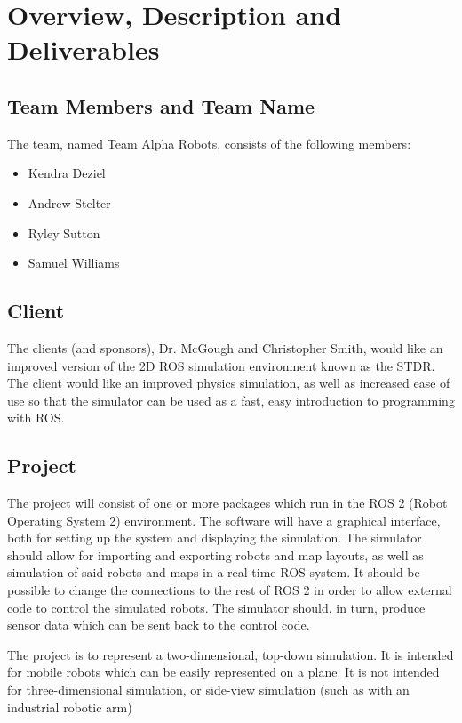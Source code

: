 

\chapter{Overview, Description and Deliverables}

\section{Team Members and Team Name}
The team, named Team Alpha Robots, consists of the following members:
\begin{itemize}
	\item Kendra Deziel
	\item Andrew Stelter
	\item Ryley Sutton
	\item Samuel Williams
\end{itemize}

\section{Client}
The clients (and sponsors), Dr. McGough and Christopher Smith, would like an improved version of the 2D ROS simulation environment known as the STDR. The client would like an improved physics simulation, as well as increased ease of use so that the simulator can be used as a fast, easy introduction to programming with ROS.

\section{Project}
The project will consist of one or more packages which run in the ROS 2 (Robot Operating System 2) environment. The software will have a graphical interface, both for setting up the system and displaying the simulation. The simulator should allow for importing and exporting robots and map layouts, as well as simulation of said robots and maps in a real-time ROS system. It should be possible to change the connections to the rest of ROS 2 in order to allow external code to control the simulated robots. The simulator should, in turn, produce sensor data which can be sent back to the control code.

The project is to represent a two-dimensional, top-down simulation. It is intended for mobile robots which can be easily represented on a plane. It is not intended for three-dimensional simulation, or side-view simulation (such as with an industrial robotic arm)

